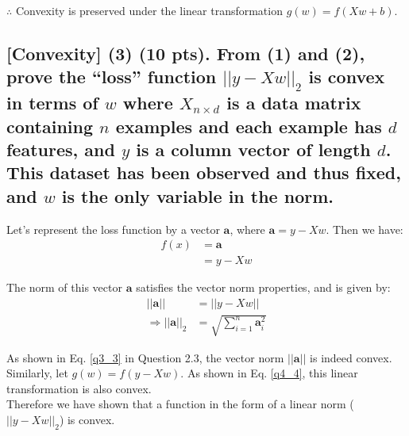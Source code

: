 $\therefore$ Convexity is preserved under the linear transformation $g(w)=f(X w + b)$.

\subsection{[Convexity] (3) (10 pts). From (1) and (2), prove the “loss” function $||y-Xw||_2$ is convex in terms of $w$ where $X_{n \times d}$ is a data matrix containing $n$ examples and each example has $d$ features, and $y$ is a column vector of length $d$. This dataset has been observed and thus fixed, and $w$ is the only variable in the norm.}

Let's represent the loss function by a vector $\mathbf{a}$, where $\mathbf{a} = y - Xw$. Then we have:
\begin{align}
    f(x) &= \mathbf{a} \nonumber \\
    &= y-Xw
\end{align}

The norm of this vector $\mathbf{a}$ satisfies the vector norm properties, and is given by:
\begin{align}
    ||\mathbf{a}|| &= || y-Xw || \nonumber \\
    \Rightarrow ||\mathbf{a}||_2 &= \sqrt{\sum_{i=1}^n \mathbf{a}_i^2}
\end{align}

As shown in Eq. \ref{q3_3} in Question 2.3, the vector norm $||\mathbf{a}||$ is indeed convex. \\

Similarly, let $g(w)=f(y-Xw)$. As shown in Eq. \ref{q4_4}, this linear transformation is also convex. \\

Therefore we have shown that a function in the form of a linear norm ($||y-Xw||_2$) is convex.

